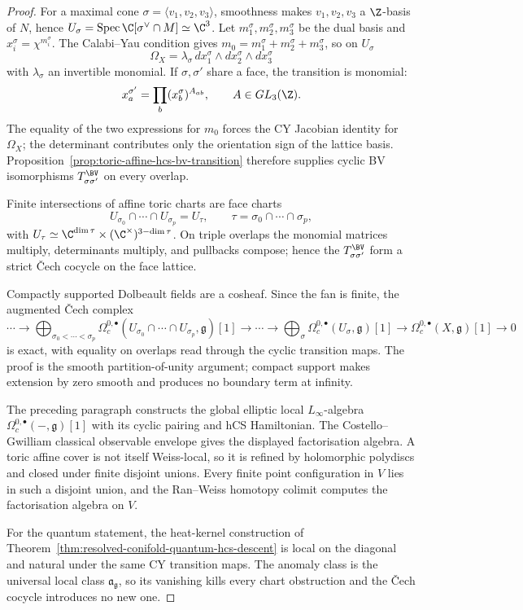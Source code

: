 \begin{proof}
For a maximal cone \(\sigma=\langle v_1,v_2,v_3\rangle\), smoothness
makes \(v_1,v_2,v_3\) a \(\Z\)-basis of \(N\), hence
\(U_\sigma=\operatorname{Spec}\C[\sigma^\vee\cap M]\simeq\C^3\).
Let \(m_1^\sigma,m_2^\sigma,m_3^\sigma\) be the dual basis and
\(x_i^\sigma=\chi^{m_i^\sigma}\).  The Calabi--Yau condition gives
\(m_0=m_1^\sigma+m_2^\sigma+m_3^\sigma\), so on \(U_\sigma\)
\[
 \Omega_X
 =
 \lambda_\sigma\,
 dx_1^\sigma\wedge dx_2^\sigma\wedge dx_3^\sigma
\]
with \(\lambda_\sigma\) an invertible monomial.  If
\(\sigma,\sigma'\) share a face, the transition is monomial:
\[
 x_a^{\sigma'}
 =
 \prod_b (x_b^\sigma)^{A_{ab}},
 \qquad A\in GL_3(\Z).
\]
The equality of the two expressions for \(m_0\) forces the CY Jacobian
identity for \(\Omega_X\); the determinant contributes only the
orientation sign of the lattice basis.  Proposition~\ref{prop:toric-affine-hcs-bv-transition}
therefore supplies cyclic BV isomorphisms \(T_{\sigma\sigma'}^{\BV}\)
on every overlap.

Finite intersections of affine toric charts are face charts
\[
 U_{\sigma_0}\cap\cdots\cap U_{\sigma_p}=U_\tau,
 \qquad
 \tau=\sigma_0\cap\cdots\cap\sigma_p,
\]
with \(U_\tau\simeq\C^{\dim\tau}\times(\C^\times)^{3-\dim\tau}\).
On triple overlaps the monomial matrices multiply, determinants
multiply, and pullbacks compose; hence the \(T_{\sigma\sigma'}^{\BV}\)
form a strict \v{C}ech cocycle on the face lattice.

Compactly supported Dolbeault fields are a cosheaf.  Since the fan is
finite, the augmented \v{C}ech complex
\[
 \cdots\to
 \bigoplus_{\sigma_0<\cdots<\sigma_p}
 \Omega_c^{0,\bullet}(U_{\sigma_0}\cap\cdots\cap U_{\sigma_p},\mathfrak g)[1]
 \to\cdots\to
 \bigoplus_\sigma\Omega_c^{0,\bullet}(U_\sigma,\mathfrak g)[1]
 \to
 \Omega_c^{0,\bullet}(X,\mathfrak g)[1]\to0
\]
is exact, with equality on overlaps read through the cyclic transition
maps.  The proof is the smooth partition-of-unity argument; compact
support makes extension by zero smooth and produces no boundary term at
infinity.

The preceding paragraph constructs the global elliptic local
\(L_\infty\)-algebra \(\Omega_c^{0,\bullet}(-,\mathfrak g)[1]\) with
its cyclic pairing and hCS Hamiltonian.  The Costello--Gwilliam
classical observable envelope gives the displayed factorisation algebra.
A toric affine cover is not itself Weiss-local, so it is refined by
holomorphic polydiscs and closed under finite disjoint unions.  Every
finite point configuration in \(V\) lies in such a disjoint union, and
the Ran--Weiss homotopy colimit computes the factorisation algebra on
\(V\).

For the quantum statement, the heat-kernel construction of
Theorem~\ref{thm:resolved-conifold-quantum-hcs-descent} is local on the
diagonal and natural under the same CY transition maps.  The anomaly
class is the universal local class \(\mathfrak a_{\mathfrak g}\), so
its vanishing kills every chart obstruction and the \v{C}ech cocycle
introduces no new one.
\end{proof}

